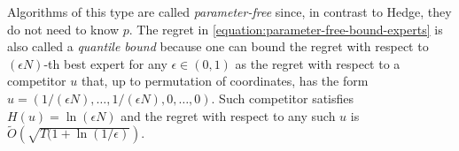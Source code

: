 Algorithms of this type are called \emph{parameter-free} since, in contrast to
Hedge, they do not need to know $p$. The regret in
\eqref{equation:parameter-free-bound-experts} is also called a \emph{quantile
bound} because one can bound the regret with respect to $(\epsilon N)$-th best
expert for any $\epsilon \in (0,1)$ as the regret with respect to a competitor
$u$ that, up to permutation of coordinates, has the form $u = \left(
1/(\epsilon N), \dots, 1/(\epsilon N), 0, \dots, 0 \right)$.  Such competitor
satisfies $H(u) = \ln (\epsilon N)$ and the regret with respect to any such $u$
is $\widetilde O(\sqrt{T (1 + \ln(1/\epsilon)})$.
